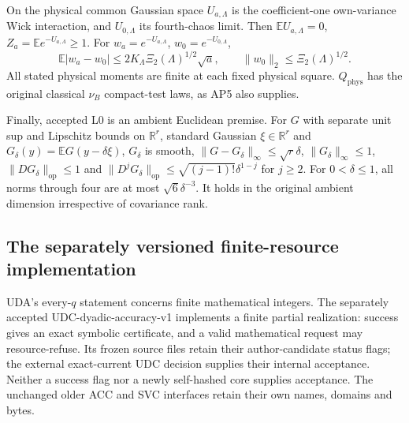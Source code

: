 \documentclass[11pt]{article}
\theoremstyle{plain}
\theoremstyle{definition}
\theoremstyle{remark}
\newcommand{\R}{\mathbb{R}}
\newcommand{\E}{\mathbb{E}}
\begin{document}
On the physical common Gaussian space $U_{a,\Lambda}$ is the
coefficient-one own-variance Wick interaction, and $U_{0,\Lambda}$ its
fourth-chaos limit. Then $\E U_{a,\Lambda}=0$,
$Z_a=\E e^{-U_{a,\Lambda}}\ge1$. For $w_a=e^{-U_{a,\Lambda}}$,
$w_0=e^{-U_{0,\Lambda}}$,
\[
 \E|w_a-w_0|\le2K_\Lambda\Xi_2(\Lambda)^{1/2}\sqrt a,
 \qquad\|w_0\|_2\le\Xi_2(\Lambda)^{1/2}.
\]
All stated physical moments are finite at each fixed physical square.
$Q_{\mathrm{phys}}$ has the original classical $\nu_B$ compact-test laws,
as AP5 also supplies.

Finally, accepted L0 is an ambient Euclidean premise. For $G$ with separate
unit sup and Lipschitz bounds on $\R^r$, standard Gaussian $\xi\in\R^r$
and $G_\delta(y)=\E G(y-\delta\xi)$, $G_\delta$ is smooth,
$\|G-G_\delta\|_\infty\le\sqrt r\delta$,
$\|G_\delta\|_\infty\le1$, $\|DG_\delta\|_{\mathrm{op}}\le1$ and
$\|D^jG_\delta\|_{\mathrm{op}}\le\sqrt{(j-1)!}\delta^{1-j}$ for $j\ge2$.
For $0<\delta\le1$, all norms through four are at most $\sqrt6\delta^{-3}$.
It holds in the original ambient dimension irrespective of covariance rank.


\subsection{The separately versioned finite-resource implementation}
\label{udc:contract}
UDA's every-$q$ statement concerns finite mathematical integers. The
separately accepted UDC-dyadic-accuracy-v1 implements a finite partial
realization: success gives an exact symbolic certificate, and a valid
mathematical request may resource-refuse. Its frozen source files retain
their author-candidate status flags; the external exact-current UDC decision
supplies their internal acceptance. Neither a success flag nor a newly
self-hashed core supplies acceptance. The unchanged older ACC and SVC
interfaces retain their own names, domains and bytes.
\end{document}
